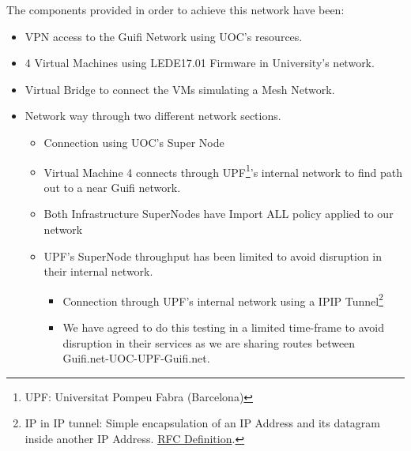 The components provided in order to achieve this network have been:
\begin{itemize}
    \item VPN access to the Guifi Network using UOC's resources.
    \item 4 Virtual Machines using LEDE17.01 Firmware in University's network.
    \item Virtual Bridge to connect the VMs simulating a Mesh Network.
    \item Network way through two different network sections.
    \begin{itemize}
        \item Connection using UOC's Super Node
        \item Virtual Machine 4 connects through UPF\footnote{UPF: Universitat Pompeu Fabra (Barcelona)}'s internal network to find path out to a near Guifi network.
        \item Both Infrastructure SuperNodes have Import ALL policy applied to our network
        \item UPF's SuperNode throughput has been limited to avoid disruption in their internal network.
        \begin{itemize}
            \item Connection through UPF's internal network using a IPIP Tunnel\footnote{IP in IP tunnel: Simple encapsulation of an IP Address and its datagram inside another IP Address. \href{https://tools.ietf.org/html/rfc2003}{RFC Definition}.}
            \item We have agreed to do this testing in a limited time-frame to avoid disruption in their services as we are sharing routes between Guifi.net-UOC-UPF-Guifi.net.
        \end{itemize}
    \end{itemize}
\end{itemize}

